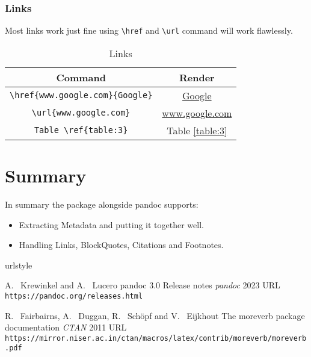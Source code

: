 \subsubsection{Links}
Most links work just fine using \verb|\href| and \verb|\url| command will work flawlessly.
\begin{table}[htbp]
\centering
\begin{tabular}{| c | c |}
 \hline
 Command & Render \\
 \hline
 \verb|\href{www.google.com}{Google}| & \href{www.google.com}{Google} \\ \hline
\verb|\url{www.google.com}| & \url{www.google.com}  \\ \hline
\verb|Table \ref{table:3}| & Table \ref{table:3}  \\ \hline
\end{tabular}
\caption{Links}
\label{table:4}
\end{table}

\section{Summary}
In summary the  package alongside pandoc supports:
\begin{itemize}
\item Extracting Metadata and putting it together well.
\item Handling Links, BlockQuotes, Citations and Footnotes.
\end{itemize}

\begin{thebibliography}{2}
    \providecommand{\natexlab}[1]{#1}
    \providecommand{\url}[1]{\texttt{#1}}
    \expandafter\ifx\csname urlstyle\endcsname\relax
      \providecommand{\doi}[1]{doi: #1}\else
      \providecommand{\doi}{doi: \begingroup \urlstyle{rm}\Url}\fi

A.~ Krewinkel and A.~ Lucero
\newblock pandoc 3.0 Release notes
\newblock \emph{pandoc}  2023
\newblock URL \url{https://pandoc.org/releases.html}

R.~ Fairbairns, A.~ Duggan, R.~ Schöpf and V.~ Eijkhout
\newblock The moreverb package documentation
\newblock \emph{CTAN}  2011
\newblock URL \url{https://mirror.niser.ac.in/ctan/macros/latex/contrib/moreverb/moreverb.pdf}

\end{thebibliography}


\address{%
Abhishek Ulayil\\
Student, Institute of Actuaries of India\\%
Mumbai, India\\
ORCiD: 0009-0000-6935-8690\\
}
